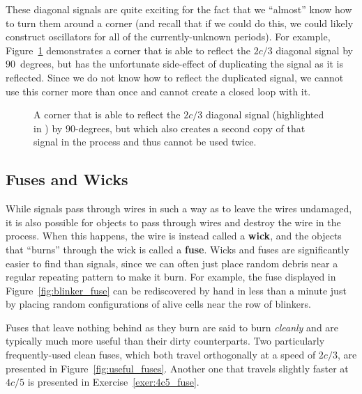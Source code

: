 These diagonal signals are quite exciting for the fact that we ``almost'' know how to turn them around a corner (and recall that if we could do this, we could likely construct oscillators for all of the currently-unknown periods). For example, Figure~\ref{fig:diagonal_2c3_almost_elbow} demonstrates a corner that is able to reflect the $2c/3$ diagonal signal by $90$~degrees, but has the unfortunate side-effect of duplicating the signal as it is reflected. Since we do not know how to reflect the duplicated signal, we cannot use this corner more than once and cannot create a closed loop with it.

\begin{figure}[!htb]
	\centering{}
	\caption{A corner that is able to reflect the $2c/3$ diagonal signal (highlighted in ) by $90$-degrees, but which also creates a second copy of that signal in the process and thus cannot be used twice.}\label{fig:diagonal_2c3_almost_elbow}
\end{figure}


\subsection{Fuses and Wicks}\label{sec:fuses}

While signals pass through wires in such a way as to leave the wires undamaged, it is also possible for objects to pass through wires and destroy the wire in the process. When this happens, the wire is instead called a \textbf{wick}, and the objects that ``burns'' through the wick is called a \textbf{fuse}. Wicks and fuses are significantly easier to find than signals, since we can often just place random debris near a regular repeating pattern to make it burn. For example, the fuse displayed in Figure~\ref{fig:blinker_fuse} can be rediscovered by hand in less than a minute just by placing random configurations of alive cells near the row of blinkers.

Fuses that leave nothing behind as they burn are said to burn \emph{cleanly} and are typically much more useful than their dirty counterparts. Two particularly frequently-used clean fuses, which both travel orthogonally at a speed of $2c/3$, are presented in Figure~\ref{fig:useful_fuses}. Another one that travels slightly faster at $4c/5$ is presented in Exercise~\ref{exer:4c5_fuse}.

